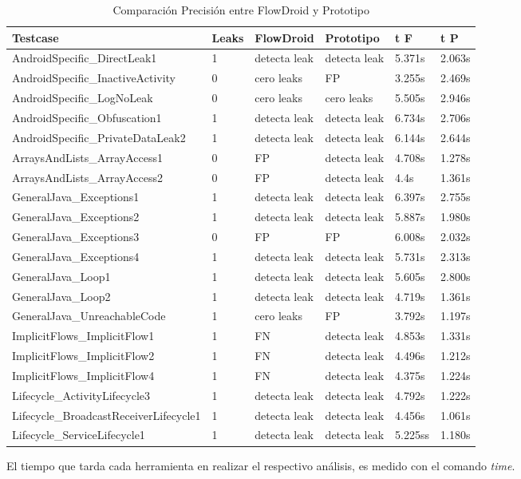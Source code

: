 \begin{table}[H]
\small\addtolength{\tabcolsep}{-3pt}
\caption{Comparación Precisión entre FlowDroid y Prototipo}
\label{tb:comparacion}
\begin{tabular}{|p{5.8cm}|p{1cm}|p{2.1cm}|p{2.1cm}|p{1cm}|p{1cm}|}
	\hline
	\textbf{Testcase} & \textbf{Leaks} & \textbf{FlowDroid} &
	\textbf{Prototipo} & \textbf{ t F} & 
	\textbf{t P}\\
	\hline
	AndroidSpecific\_DirectLeak1 & 1 & detecta leak & detecta leak &5.371s &2.063s\\
	\hline
	AndroidSpecific\_InactiveActivity & 0 & cero leaks & FP  &3.255s &2.469s\\
	\hline
	AndroidSpecific\_LogNoLeak & 0 & cero leaks & cero leaks &5.505s &2.946s\\
	\hline
	 AndroidSpecific\_Obfuscation1 & 1 & detecta leak & detecta leak &6.734s
	 &2.706s\\
	\hline
	 AndroidSpecific\_PrivateDataLeak2 & 1 & detecta leak & detecta leak &
	 6.144s &2.644s\\
	\hline
	 ArraysAndLists\_ArrayAccess1 & 0 & FP & detecta leak & 4.708s & 1.278s\\
	\hline
	 ArraysAndLists\_ArrayAccess2 & 0 & FP & detecta leak & 4.4s &1.361s\\
	 \hline
	 GeneralJava\_Exceptions1 & 1 & detecta leak & detecta leak &6.397s &2.755s\\
	\hline
	 GeneralJava\_Exceptions2 & 1 & detecta leak & detecta leak &5.887s &1.980s\\
	\hline
	GeneralJava\_Exceptions3 & 0 & FP & FP &6.008s &2.032s\\
	\hline
	GeneralJava\_Exceptions4 & 1 & detecta leak & detecta leak &5.731s &2.313s\\
	\hline
	GeneralJava\_Loop1 & 1 & detecta leak & detecta leak &5.605s
	&2.800s\\
	\hline
	GeneralJava\_Loop2 & 1 & detecta leak & detecta leak &4.719s
	&1.361s\\
	\hline
	GeneralJava\_UnreachableCode & 1 & cero leaks & FP &3.792s &1.197s\\
	\hline
	ImplicitFlows\_ImplicitFlow1 & 1 & FN & detecta leak &4.853s &1.331s\\
	\hline
	ImplicitFlows\_ImplicitFlow2 & 1 & FN & detecta leak &4.496s &1.212s\\
	\hline
	ImplicitFlows\_ImplicitFlow4 & 1 & FN & detecta leak &4.375s &1.224s\\
	\hline
	Lifecycle\_ActivityLifecycle3 & 1 & detecta leak & detecta leak &4.792s
	&1.222s\\
	\hline
	Lifecycle\_BroadcastReceiverLifecycle1 & 1 & detecta leak & detecta leak
	&4.456s &1.061s\\
	\hline
	Lifecycle\_ServiceLifecycle1 & 1 & detecta leak &detecta leak &5.225ss
	&1.180s\\
	\hline
\end{tabular}
\end{table}

El tiempo que tarda cada herramienta en realizar el respectivo análisis, es
medido con el comando \textit{time}.
